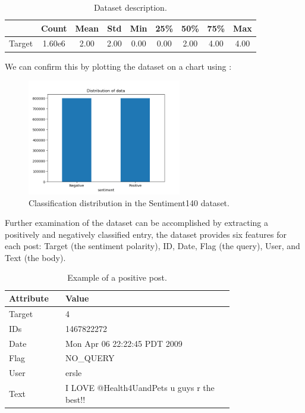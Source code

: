         \begin{table}[h]
            \centering
            \caption{Dataset description.}
            \label{tbl:datasetdescription}
            \begin{tabular}{c|c|c|c|c|c|c|c|c}
                & Count & Mean & Std & Min & 25\% & 50\% & 75\% & Max \\
                \hline\hline
                Target & 1.60e6 & 2.00 & 2.00 & 0.00 & 0.00 & 2.00 & 4.00 & 4.00 \\
            \end{tabular}
        \end{table}

        We can confirm this by plotting the dataset on a chart using :

        \begin{figure}[h]
            \centering
            \includegraphics[width=0.6\textwidth]{figures/sentiment140-dataset-distribution.png}
            \caption{Classification distribution in the Sentiment140 dataset.}
        \end{figure}
        \FloatBarrier

        Further examination of the dataset can be accomplished by extracting a positively and negatively classified entry, the dataset provides six features for each post: Target (the sentiment polarity), ID, Date, Flag (the query), User, and Text (the body).

        \FloatBarrier
        \begin{table}[h]
            \centering
            \caption{Example of a positive post.}
            \label{tbl:positive_post}
            \begin{tabular}{p{0.15\linewidth} | p{0.6\linewidth}}
                Attribute & Value \\
                \hline\hline
                Target & 4 \\
                IDs & 1467822272 \\
                Date & Mon Apr 06 22:22:45 PDT 2009 \\
                Flag & NO\_QUERY \\
                User & ersle \\
                Text & I LOVE @Health4UandPets u guys r the best!! \\
            \end{tabular}
        \end{table}

